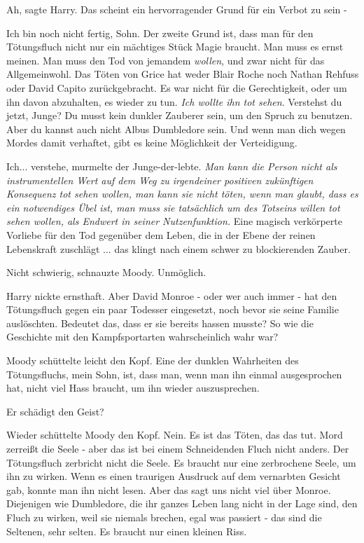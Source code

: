 \glqq Ah\grqq{}, sagte Harry. \glqq Das scheint ein hervorragender Grund für ein
Verbot zu sein -\grqq{}

\glqq Ich bin noch nicht fertig, Sohn. Der zweite Grund ist, dass man für den
Tötungsfluch nicht nur ein mächtiges Stück Magie braucht. Man muss es ernst
meinen. Man muss den Tod von jemandem \emph{wollen}, und zwar nicht für das
Allgemeinwohl. Das Töten von Grice hat weder Blair Roche noch Nathan Rehfuss
oder David Capito zurückgebracht. Es war nicht für die Gerechtigkeit, oder um
ihn davon abzuhalten, es wieder zu tun. \emph{Ich wollte ihn tot sehen}.
Verstehst du jetzt, Junge? Du musst kein dunkler Zauberer sein, um den Spruch zu
benutzen. Aber du kannst auch nicht Albus Dumbledore sein. Und wenn man dich
wegen Mordes damit verhaftet, gibt es keine Möglichkeit der Verteidigung.\grqq{}

\glqq Ich... verstehe\grqq{}, murmelte der Junge-der-lebte.
\emph{Man kann die Person nicht als instrumentellen Wert auf dem Weg zu irgendeiner positiven zukünftigen Konsequenz tot sehen wollen, man kann sie nicht töten, wenn man glaubt, dass es ein notwendiges Übel ist, man muss sie tatsächlich um des Totseins willen tot sehen wollen, als Endwert in seiner Nutzenfunktion.}
\glqq Eine magisch verkörperte Vorliebe für den Tod gegenüber dem Leben, die in
der Ebene der reinen Lebenskraft zuschlägt ... das klingt nach einem schwer zu
blockierenden Zauber.\grqq{}

\glqq Nicht schwierig\grqq{}, schnauzte Moody. \glqq Unmöglich.\grqq{}

Harry nickte ernsthaft. \glqq Aber David Monroe - oder wer auch immer - hat den
Tötungsfluch gegen ein paar Todesser eingesetzt, noch bevor sie seine Familie
auslöschten. Bedeutet das, dass er sie bereits hassen musste? So wie die
Geschichte mit den Kampfsportarten wahrscheinlich wahr war?\grqq{}

Moody schüttelte leicht den Kopf. \glqq Eine der dunklen Wahrheiten des
Tötungsfluchs, mein Sohn, ist, dass man, wenn man ihn einmal ausgesprochen hat,
nicht viel Hass braucht, um ihn wieder auszusprechen.\grqq{}

\glqq Er schädigt den Geist?\grqq{}

Wieder schüttelte Moody den Kopf. \glqq Nein. Es ist das Töten, das das tut.
Mord zerreißt die Seele - aber das ist bei einem Schneidenden Fluch nicht
anders. Der Tötungsfluch zerbricht nicht die Seele. Es braucht nur eine
zerbrochene Seele, um ihn zu wirken.\grqq{} Wenn es einen traurigen Ausdruck auf
dem vernarbten Gesicht gab, konnte man ihn nicht lesen. \glqq Aber das sagt uns
nicht viel über Monroe. Diejenigen wie Dumbledore, die ihr ganzes Leben lang
nicht in der Lage sind, den Fluch zu wirken, weil sie niemals brechen, egal was
passiert - das sind die Seltenen, sehr selten. Es braucht nur einen kleinen
Riss.\grqq{}

